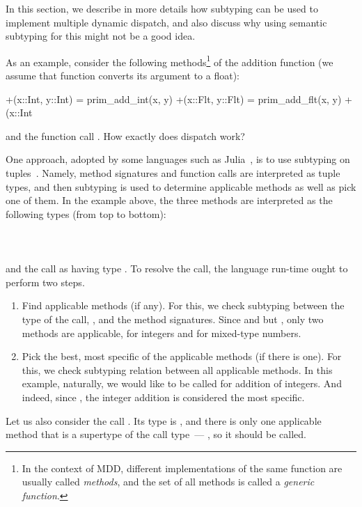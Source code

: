 In this section, we describe in more details how subtyping
can be used to implement multiple dynamic dispatch,
and also discuss why using semantic subtyping for this
might not be a good idea.

As an example, consider the following methods\footnote{In the context of MDD, 
	different implementations of 
	the same function are usually called \emph{methods},
	and the set of all methods is called a \emph{generic function}.}
of the addition function (we assume that function  
converts its argument to a float):
\begin{lstminijl}
+(x::Int, y::Int) = prim_add_int(x, y) 
+(x::Flt, y::Flt) = prim_add_flt(x, y) 
+(x::Int%
\end{lstminijl}
and the function call .
How exactly does dispatch work?

One approach, adopted by some languages
such as Julia~\cite{Bezanson2015AbstractionIT}, 
is to use subtyping on tuples~\cite{bib:Leavens:1998:mddtuples}.
Namely, method signatures and function calls are interpreted as tuple types,
and then subtyping is used to determine applicable methods 
as well as pick one of them.
In the example above, the three methods are interpreted 
as the following types (from top to bottom):\\
\\
\\
\\
and the call as having type .
To resolve the call, the language run-time ought to perform two steps.
\begin{enumerate}
  \item Find applicable methods (if any). For this, we check subtyping between
    the type of the call, , and the method signatures.
    Since  and  but
    , only two methods are applicable,
     for integers and  for mixed-type numbers.
  \item Pick the best, most specific of the applicable methods
    (if there is one).
    For this, we check subtyping relation between all applicable methods.
    In this example, naturally, we would like  to be called
    for addition of integers. And indeed, since ,
    the integer addition is considered the most specific.
\end{enumerate}
Let us also consider the call . Its type is
, and there is only one applicable method that is
a supertype of the call type~--- , so it should be called.

